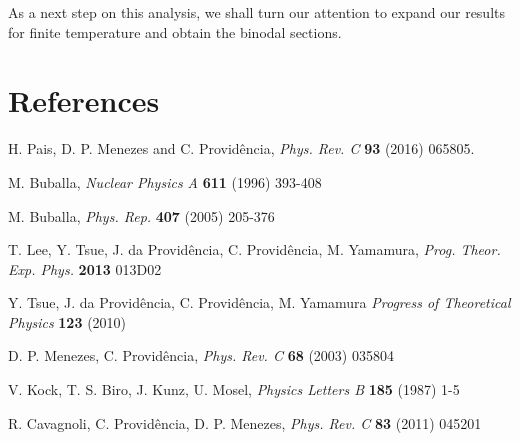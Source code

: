 \documentclass{ws-ijmpcs}
\begin{document}
As a next step on this analysis, we shall turn our attention to expand our results for finite temperature and obtain the binodal sections.

\section{References}

\begin{thebibliography}{00}    %

 H. Pais, D. P. Menezes and C. Providência, {\it Phys. Rev. C} {\bf 93} (2016) 065805.

 M. Buballa, {\it Nuclear Physics A} {\bf 611} (1996) 393-408

 M. Buballa, {\it Phys. Rep.} {\bf 407} (2005) 205-376

 T. Lee, Y. Tsue, J. da Provid{\^e}ncia, C. Provid{\^e}ncia, M. Yamamura, {\it Prog. Theor. Exp. Phys.} {\bf 2013} 013D02

 Y. Tsue, J. da Provid{\^e}ncia, C. Provid{\^e}ncia, M. Yamamura {\it Progress of Theoretical Physics} {\bf 123} (2010)

 D. P. Menezes, C. Providência, {\it Phys. Rev. C} {\bf 68} (2003) 035804

 V. Kock, T. S. Biro, J. Kunz, U. Mosel, {\it Physics Letters B} {\bf 185} (1987) 1-5

 R. Cavagnoli, C. Providência, D. P. Menezes, {\it Phys. Rev. C} {\bf 83} (2011) 045201

\end{thebibliography}
\end{document}
